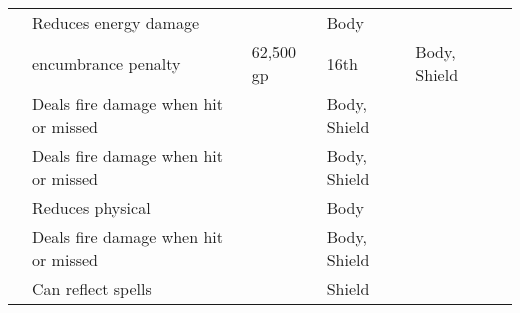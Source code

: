 \begin{longtabuwrapper}
\begin{longtabu}{l X l l l l}
                 & Reduces energy damage &  & Body &  \\
                  &  encumbrance penalty & 62,500 gp & 16th & Body, Shield &  \\
                 & Deals fire damage when hit or missed &  & Body, Shield &  \\
                 & Deals fire damage when hit or missed &  & Body, Shield &  \\
                 & Reduces physical &  & Body &  \\
                 & Deals fire damage when hit or missed &  & Body, Shield &  \\
                 & Can reflect spells &  & Shield &  \\


\end{longtabu}
\end{longtabuwrapper}
